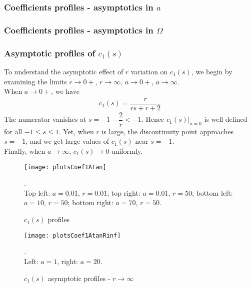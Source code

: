 \documentclass[12pt,twoside]{article}
\begin{document}
\subsubsection{Coefficients profiles - asymptotics in $a$  }

\subsubsection{Coefficients profiles - asymptotics in $\Omega$  }

\subsubsection{Asymptotic profiles of $c_1(s)$}
To understand the asymptotic effect of $r$ variation on $c_1(s)$, we begin by examining the limits $r \rightarrow 0+$, $r \rightarrow \infty$, $a \rightarrow 0+$, $a \rightarrow \infty$.\\

When $a \rightarrow 0+$, we have 
\begin{align}
\label{eqns:1-D-time-harmonic-E3_s_Atan_coef_1_non_dim_a_0}
c_1(s) = \dfrac{r}{r s+r+2}
\end{align}
The numerator vanishes at $s = -1-\dfrac{2}{r}<-1$. Hence $c_1(s)\vert_{a=0}$ is well defined for all $-1 \leq s \leq 1$. Yet, when $r$ is large, the discontinuity point approaches $s=-1$, and we get large values of $c_1(s)$ near $s = -1$. \\
Finally, when $a \rightarrow \infty$, $c_1(s) \rightarrow 0$ uniformly. \begin{figure}
\begin{center}
\texttt{[image: plotsCoef1Atan]}
\end{center}
\caption {$c_1(s)$ profiles}.\\
Top left: $a=0.01$, $r=0.01$; top right: $a=0.01$, $r=50$; bottom left: $a=10$, $r=50$; bottom right: $a=70$, $r=50$.


\label{fig:c1Atan}
\end{figure}

\begin{figure}
\begin{center}
\texttt{[image: plotsCoef1AtanRinf]}
\end{center}
\caption {$c_1(s)$ asymptotic profiles - $r \rightarrow \infty$}.\\
Left: $a=1$, right: $a=20$.


\label{fig:c1AtanRinf}
\end{figure}
\end{document}
